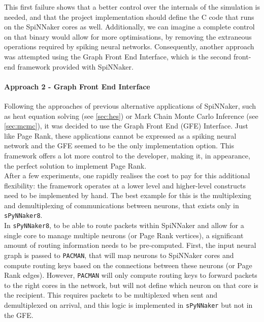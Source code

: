 This first failure shows that a better control over the internals of the simulation is needed, and that the project implementation should define the C code that runs on the SpiNNaker cores as well. Additionally, we can imagine a complete control on that binary would allow for more optimisations, by removing the extraneous operations required by spiking neural networks. Consequently, another approach was attempted using the Graph Front End Interface, which is the second front-end framework provided with SpiNNaker.


\paragraph{Approach 2 - Graph Front End Interface}

Following the approaches of previous alternative applications of SpiNNaker, such as heat equation solving (see \ref{sec:hes}) or Mark Chain Monte Carlo Inference (see \ref{sec:mcmc}), it was decided to use the Graph Front End (GFE) Interface. Just like Page Rank, these applications cannot be expressed as a spiking neural network and the GFE seemed to be the only implementation option. This framework offers a lot more control to the developer, making it, in appearance, the perfect solution to implement Page Rank. \\

After a few experiments, one rapidly realises the cost to pay for this additional flexibility: the framework operates at a lower level and higher-level constructs need to be implemented by hand. The best example for this is the multiplexing and demultiplexing of communications between neurons, that exists only in \texttt{sPyNNaker8}. \\

In \texttt{sPyNNaker8}, to be able to route packets within SpiNNaker and allow for a single core to manage multiple neurons (or Page Rank vertices), a significant amount of routing information needs to be pre-computed. First, the input neural graph is passed to \texttt{PACMAN}, that will map neurons to SpiNNaker cores and compute routing keys based on the connections between these neurons (or Page Rank edges). However, \texttt{PACMAN} will only compute routing keys to forward packets to the right cores in the network, but will not define which neuron on that core is the recipient. This requires packets to be multiplexed when sent and demultiplexed on arrival, and this logic is implemented in \texttt{sPyNNaker} but not in the GFE. \\

